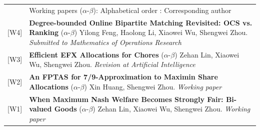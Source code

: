 \documentclass[letterpaper, 11pt]{article}
\newcommand{\headingfont}{\Large\color{OliveGreen}}
\newenvironment{SectionTable}[1]{
	\renewcommand*{\arraystretch}{1.2}
	\setlength{\tabcolsep}{10pt}
	\begin{longtable}{Rp{5.2in}} & #1 \\}
{\end{longtable}\vspace{-1cm}}
\begin{document}
\begin{SectionTable}{\headingfont Working papers \; \small\color{black}  ($\alpha$-$\beta$): Alphabetical order \quad \Letter: Corresponding author}

[W4] & 
\textbf{Degree-bounded Online Bipartite Matching Revisited: OCS vs. Ranking} \newline
($\alpha$-$\beta$) Yilong Feng, Haolong Li, Xiaowei Wu, Shengwei Zhou.  \newline
\textit{Submitted to Mathematics of Operations Research}\\

[W3] & 
\textbf{Efficient EFX Allocations for Chores} \newline
($\alpha$-$\beta$) Zehan Lin, Xiaowei Wu, Shengwei Zhou.  \newline
\textit{Revision at Artificial Intelligence}\\

[W2] & 
\textbf{An FPTAS for 7/9-Approximation to Maximin Share Allocations} \newline
($\alpha$-$\beta$) Xin Huang, Shengwei Zhou.  \newline
\textit{Working paper}\\

[W1] & 
\textbf{When Maximum Nash Welfare Becomes Strongly Fair: Bi-valued Goods} \newline
($\alpha$-$\beta$) Zehan Lin, Xiaowei Wu, Shengwei Zhou.  \newline
\textit{Working paper}\\

\end{SectionTable}
\end{document}
